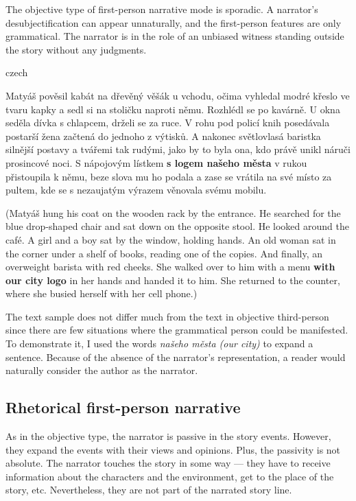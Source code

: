 The objective type of first-person narrative mode is sporadic. A narrator's desubjectification can appear unnaturally, and the first-person features are only grammatical. The narrator is in the role of an unbiased witness standing outside the story without any judgments. \cite{dolezel-narativni-zpusoby}
\newline

\begin{otherlanguage*}{czech}
\begin{quoting}
Matyáš pověsil kabát na dřevěný věšák u vchodu, očima vyhledal modré křeslo ve tvaru kapky a sedl si na stoličku naproti němu. Rozhlédl se po kavárně. U okna seděla dívka s chlapcem, drželi se za ruce. V rohu pod policí knih posedávala postarší žena začtená do jednoho z výtisků. A nakonec světlovlasá baristka silnější postavy a tvářemi tak rudými, jako by to byla ona, kdo právě unikl náruči prosincové noci. S nápojovým lístkem \textbf{s logem našeho města} v rukou přistoupila k němu, beze slova mu ho podala a zase se vrátila na své místo za pultem, kde se s nezaujatým výrazem věnovala svému mobilu.
\newline
\end{quoting}
\end{otherlanguage*}
\begin{quoting}
(Matyáš hung his coat on the wooden rack by the entrance. He searched for the blue drop-shaped chair and sat down on the opposite stool. He looked around the café. A girl and a boy sat by the window, holding hands. An old woman sat in the corner under a shelf of books, reading one of the copies. And finally, an overweight barista with red cheeks. She walked over to him with a menu \textbf{with our city logo} in her hands and handed it to him. She returned to the counter, where she busied herself with her cell phone.)
\newline
\end{quoting}

The text sample does not differ much from the text in objective third-person since there are few situations where the grammatical person could be manifested. To demonstrate it, I used the words \emph{našeho města (our city)} to expand a sentence. Because of the absence of the narrator's representation, a reader would naturally consider the author as the narrator.

\subsection{Rhetorical first-person narrative}
As in the objective type, the narrator is passive in the story events. However, they expand the events with their views and opinions. Plus, the passivity is not absolute. The narrator touches the story in some way --- they have to receive information about the characters and the environment, get to the place of the story, etc. Nevertheless, they are not part of the narrated story line.\cite{dolezel-narativni-zpusoby}\newline

